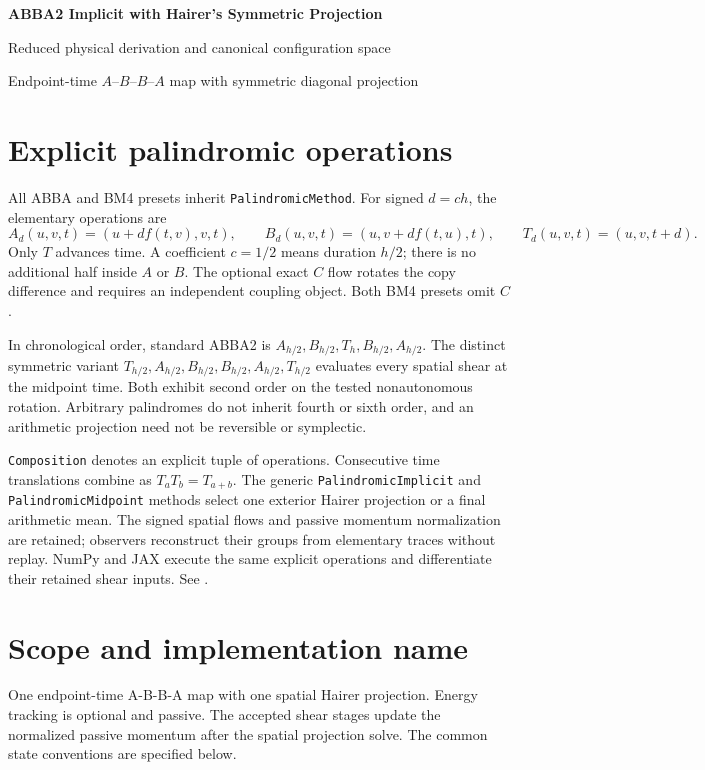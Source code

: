 \documentclass[11pt,a4paper]{article}
\begin{document}
\begin{center}
  {\LARGE\bfseries\color{blue}ABBA2 Implicit with Hairer's Symmetric Projection}\par
  \vspace{0.35em}
  {\large Reduced physical derivation and canonical configuration space}\par
  \vspace{0.45em}
  {\small Endpoint-time $A$--$B$--$B$--$A$ map with symmetric diagonal projection}
\end{center}

\section*{Explicit palindromic operations}
All ABBA and BM4 presets inherit \texttt{PalindromicMethod}. For signed
$d=c h$, the elementary operations are
\[
 A_d(u,v,t)=(u+d f(t,v),v,t),\qquad
 B_d(u,v,t)=(u,v+d f(t,u),t),\qquad
 T_d(u,v,t)=(u,v,t+d).
\]
Only $T$ advances time. A coefficient $c=1/2$ means duration $h/2$;
there is no additional half inside $A$ or $B$. The optional exact $C$ flow
rotates the copy difference and requires an independent coupling object.
Both BM4 presets omit $C$.

In chronological order, standard ABBA2 is
$A_{h/2},B_{h/2},T_h,B_{h/2},A_{h/2}$.
The distinct symmetric variant
$T_{h/2},A_{h/2},B_{h/2},B_{h/2},A_{h/2},T_{h/2}$
evaluates every spatial shear at the midpoint time. Both exhibit second
order on the tested nonautonomous rotation. Arbitrary palindromes do not
inherit fourth or sixth order, and an arithmetic projection need not be
reversible or symplectic.

\texttt{Composition} denotes an explicit tuple of operations.
Consecutive time translations combine as $T_a T_b=T_{a+b}$.
The generic \texttt{PalindromicImplicit} and \texttt{PalindromicMidpoint}
methods select one exterior Hairer projection or a final arithmetic mean.
The signed spatial flows and passive momentum normalization are retained;
observers reconstruct their groups from elementary traces without replay. NumPy and JAX execute the same
explicit operations and differentiate their retained shear inputs.
See .


\vspace{0.5em}

\section{Scope and implementation name}
One endpoint-time A-B-B-A map with one spatial Hairer projection. Energy tracking is optional and passive.
The accepted shear stages update the normalized passive momentum after the spatial projection solve.
The common state conventions are specified below.
\end{document}
